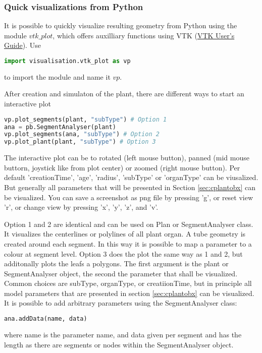 
\subsubsection*{Quick visualizations from Python}

It is possible to quickly visualize resulting geometry from Python using the module $vtk\_plot$, which offers auxilliary functions using VTK (\href{https://vtk.org/vtk-users-guide/}{VTK User's Guide}). Use 
\begin{lstlisting}[language=Python]
import visualisation.vtk_plot as vp
\end{lstlisting}
to import the module and name it $vp$.

After creation and simulaton of the plant, there are different ways to start an interactive plot
\begin{lstlisting}[language=Python]
vp.plot_segments(plant, "subType") # Option 1
ana = pb.SegmentAnalyser(plant)
vp.plot_segments(ana, "subType") # Option 2
vp.plot_plant(plant, "subType") # Option 3
\end{lstlisting}
The interactive plot can be to rotated (left mouse button), panned (mid mouse buttorn, joystick like from plot center) or zoomed (right mouse button). Per default 'creationTime', 'age', 'radius', 'subType' or 'organType' can be viusalized. But generally all parameters that will be presented in Section \ref{sec:cplantobx} can be visualized. You can save a screenshot as png file by pressing 'g', or reset view 'r', or change view by pressing 'x', 'y', 'z', and 'v'.

Option 1 and 2 are identical and can be used on Plan or SegmentAnalyser class. It visualizes the centerlines or polylines of all plant organ. A tube geometry is created around each segment. In this way it is possible to map a parameter to a colour at segment level. 
Option 3 does the plot the same way as 1 and 2, but additonally plots the leafs a polygons. The first argument is the plant or SegmentAnalyser object, the second the parameter that shall be visualized. Common choices are subType, organType, or creatiionTime, but in principle all model parameters that are presented in section \ref{sec:cplantobx} can be visualized. \\

It is possible to add arbitrary parameters using the SegmentAnalyser class: 
\begin{lstlisting}[language=Python]
ana.addData(name, data) 
\end{lstlisting}
where name is the parameter name, and data given per segment and has the length as there are segments or nodes within the SegmentAnalyser object.

